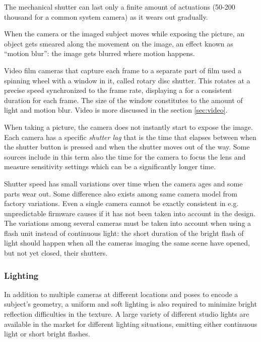 The mechanical shutter can last only a finite amount of actuations (50-200 thousand for a common system camera) as it wears out gradually.

%



When the camera or the imaged subject moves while exposing the picture, an object gets smeared along the movement on the image, an effect known as ``motion blur'': the image gets blurred where motion happens.

Video film cameras that capture each frame to a separate part of film used a spinning wheel with a window in it, called rotary disc shutter. \cite{wilson2004anton}
This rotates at a precise speed synchronized to the frame rate, displaying a for a consistent duration for each frame.
The size of the window constitutes to the amount of light and motion blur. Video is more discussed in the section \ref{sec:video}.

When taking a picture, the camera does not instantly start to expose the image.
Each camera has a specific \emph{shutter lag} that is the time that elapses between when the shutter button is pressed and when the shutter moves out of the way.
Some sources include in this term also the time for the camera to focus the lens and measure sensitivity settings which can be a significantly longer time.

Shutter speed has small variations over time when the camera ages and some parts wear out.
Some difference also exists among same camera model from factory variations.
Even a single camera cannot be exactly consistent in e.g. unpredictable firmware causes if it has not been taken into account in the design.
The variations among several cameras must be taken into account when using a flash unit instead of continuous light: the short duration of the bright flash of light should happen when all the cameras imaging the same scene have opened, but not yet closed, their shutters.



\subsubsection{Lighting} %

In addition to multiple cameras at different locations and poses to encode a subject's geometry, a uniform and soft lighting is also required to minimize bright reflection difficulties in the texture.
A large variety of different studio lights are available in the market for different lighting situations, emitting either continuous light or short bright flashes.

